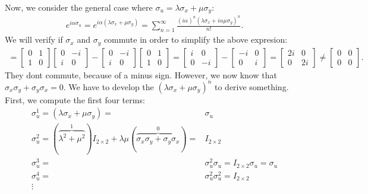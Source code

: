 \documentclass[letterpaper,11pt,twoside]{article}
\begin{document}
Now, we consider the general case where $\sigma_u=\lambda\sigma_x+\mu\sigma_y$:
\begin{align*}
  e^{i\alpha\sigma_u}=e^{i\alpha(\lambda\sigma_x+\mu\sigma_y)}=\sum_{n=1}^\infty\frac{(i\alpha)^n(\lambda\sigma_x+i\alpha\mu\sigma_y)^n}{n!}.
\end{align*}
We will verify if $\sigma_x$ and $\sigma_y$ commute in order to simplify the above expresion:
\begin{align*}
  [\sigma_x,\sigma_y]=\begin{bmatrix}
    0&1\\1&0
  \end{bmatrix}\begin{bmatrix}
    0&-i\\i&0
  \end{bmatrix}-\begin{bmatrix}
    0&-i\\i&0
  \end{bmatrix}\begin{bmatrix}
    0&1\\1&0
  \end{bmatrix}=\begin{bmatrix}
    i&0\\0&-i
  \end{bmatrix}-\begin{bmatrix}
    -i&0\\0&i
  \end{bmatrix}=\begin{bmatrix}
    2i&0\\0&2i
  \end{bmatrix}\neq\begin{bmatrix}
    0&0\\0&0
  \end{bmatrix}.
\end{align*}
They dont commute, because of a minus sign. However, we now know that $\sigma_x\sigma_y+\sigma_y\sigma_x=0$. We have to 
develop the $(\lambda\sigma_x+\mu\sigma_y)^n$ to derive something. First, we compute the first four terms:
{\small
\begin{align*}
    \sigma_u^1=(\lambda\sigma_x+\mu\sigma_y)=&\sigma_u\\
    \sigma_u^2=(\overbrace{\lambda^2+\mu^2}^{1})I_{2\times2}+\lambda\mu(\overbrace{\sigma_x\sigma_y+\sigma_y\sigma_x}^{0})=&I_{2\times2}\\
    \sigma_u^3=&\sigma_u^2\sigma_u=I_{2\times2}\sigma_u=\sigma_u\\
    \sigma_u^4=&\sigma_u^2\sigma_u^2=I_{2\times2}\\
    \vdots&
\end{align*}}
\end{document}
